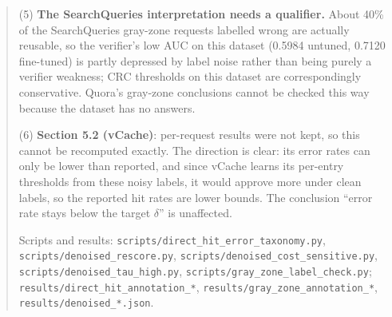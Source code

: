 \documentclass[11pt]{article}
\begin{document}
\begin{quote}
\noindent (5) \textbf{The SearchQueries interpretation needs a qualifier.} About 40\% of the SearchQueries gray-zone requests labelled wrong are actually reusable, so the verifier's low AUC on this dataset (0.5984 untuned, 0.7120 fine-tuned) is partly depressed by label noise rather than being purely a verifier weakness; CRC thresholds on this dataset are correspondingly conservative. Quora's gray-zone conclusions cannot be checked this way because the dataset has no answers.

\noindent (6) \textbf{Section 5.2 (vCache)}: per-request results were not kept, so this cannot be recomputed exactly. The direction is clear: its error rates can only be lower than reported, and since vCache learns its per-entry thresholds from these noisy labels, it would approve more under clean labels, so the reported hit rates are lower bounds. The conclusion ``error rate stays below the target $\delta$'' is unaffected.

\noindent Scripts and results: \texttt{scripts/\allowbreak{}direct\_\allowbreak{}hit\_\allowbreak{}error\_\allowbreak{}taxonomy.\allowbreak{}py}, \texttt{scripts/\allowbreak{}denoised\_\allowbreak{}rescore.\allowbreak{}py}, \texttt{scripts/\allowbreak{}denoised\_\allowbreak{}cost\_\allowbreak{}sensitive.\allowbreak{}py}, \texttt{scripts/\allowbreak{}denoised\_\allowbreak{}tau\_\allowbreak{}high.\allowbreak{}py}, \texttt{scripts/\allowbreak{}gray\_\allowbreak{}zone\_\allowbreak{}label\_\allowbreak{}check.\allowbreak{}py}; \texttt{results/\allowbreak{}direct\_\allowbreak{}hit\_\allowbreak{}annotation\_\allowbreak{}*}, \texttt{results/\allowbreak{}gray\_\allowbreak{}zone\_\allowbreak{}annotation\_\allowbreak{}*}, \texttt{results/\allowbreak{}denoised\_\allowbreak{}*.\allowbreak{}json}.
\end{quote}
\end{document}
